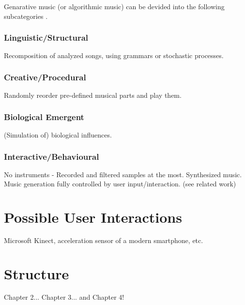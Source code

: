 Genarative music (or algorithmic music) can be devided into the following subcategories \cite{Wooller2005}.

\subsubsection{Linguistic/Structural}

Recomposition of analyzed songs, using grammars or stochastic processes. 

\subsubsection{Creative/Procedural}

Randomly reorder pre-defined musical parts and play them.

\subsubsection{Biological Emergent}

(Simulation of) biological influences.

\subsubsection{Interactive/Behavioural}

No instruments - Recorded and filtered samples at the most. Synthesized music. Music generation fully controlled by user input/interaction. (see related work)

\section{Possible User Interactions}
Microsoft Kinect, acceleration sensor of a modern smartphone, etc.

\section{Structure}
Chapter 2... Chapter 3... and Chapter 4!